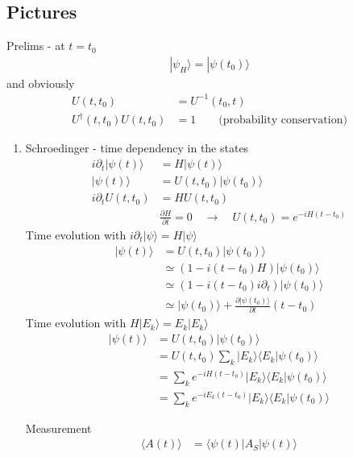 \documentclass[10pt,a4paper]{book}
\theoremstyle{definition}
\begin{document}
\subsection{Pictures}
Prelims - at $t=t_0$
\begin{align}
|\psi_H\rangle=|\psi(t_0)\rangle
\end{align}
and obviously
\begin{align}
U(t,t_0)&=U^{-1}(t_0,t)\\
U^\dagger(t,t_0)U(t,t_0)&=1\qquad\text{(probability conservation)}
\end{align}

\begin{enumerate}
\item Schroedinger - time dependency in the states
\begin{align}
i\partial_t|\psi(t)\rangle&=H|\psi(t)\rangle\\
|\psi(t)\rangle&=U(t,t_0)|\psi(t_0)\rangle\\
i\partial_t U(t,t_0)&=HU(t,t_0)\\
&\frac{\partial H}{\partial t}=0\quad\rightarrow\quad U(t,t_0)=e^{-iH(t-t_0)}
\end{align}
Time evolution with $i\partial_t |\psi\rangle=H|\psi\rangle$
\begin{align}
|\psi(t)\rangle
&=U(t,t_0)|\psi(t_0)\rangle\\
&\simeq(1-i(t-t_0)H)|\psi(t_0)\rangle\\
&\simeq(1-i(t-t_0)i\partial_t)|\psi(t_0)\rangle\\
&\simeq|\psi(t_0)\rangle+\frac{\partial |\psi(t_0)\rangle}{\partial t}(t-t_0)
\end{align}
Time evolution with $H|E_k\rangle=E_k|E_k\rangle$
\begin{align}
|\psi(t)\rangle
&=U(t,t_0)|\psi(t_0)\rangle\\
&=U(t,t_0)\sum_k |E_k\rangle\langle E_k|\psi(t_0)\rangle\\
&=\sum_k e^{-iH(t-t_0)}|E_k\rangle\langle E_k|\psi(t_0)\rangle\\
&=\sum_k e^{-iE_k(t-t_0)}|E_k\rangle\langle E_k|\psi(t_0)\rangle
\end{align}

Measurement
\begin{align}
\langle A(t)\rangle&=\langle\psi(t)|A_S|\psi(t)\rangle
\end{align}


\end{enumerate}
\end{document}
